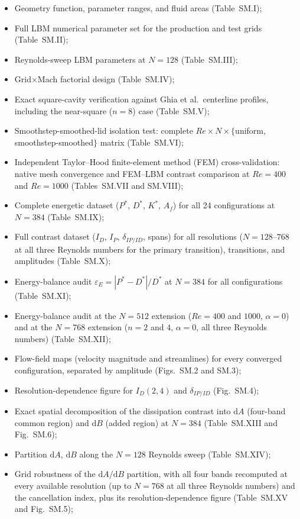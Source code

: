 \documentclass[aip,pof,reprint]{revtex4-2}
\begin{document}
\begin{itemize}
\item Geometry function, parameter ranges, and fluid areas (Table~SM.I);
\item Full LBM numerical parameter set for the production and test grids (Table~SM.II);
\item Reynolds-sweep LBM parameters at $N=128$ (Table~SM.III);
\item Grid$\times$Mach factorial design (Table~SM.IV);
\item Exact square-cavity verification against Ghia et al.\ centerline profiles, including the near-square ($n=8$) case (Table~SM.V);
\item Smoothstep-smoothed-lid isolation test: complete $Re\times N\times\{$uniform, smoothstep-smoothed$\}$ matrix (Table~SM.VI);
\item Independent Taylor--Hood finite-element method (FEM) cross-validation: native mesh convergence and FEM--LBM contrast comparison at $Re=400$ and $Re=1000$ (Tables~SM.VII and SM.VIII);
\item Complete energetic dataset ($P^*$, $D^*$, $K^*$, $A_f$) for all 24 configurations at $N=384$ (Table~SM.IX);
\item Full contrast dataset ($I_D$, $I_P$, $\delta_{IP/ID}$, spans) for all resolutions ($N=128$--$768$ at all three Reynolds numbers for the primary transition), transitions, and amplitudes (Table~SM.X);
\item Energy-balance audit $\varepsilon_E = |P^*-D^*|/D^*$ at $N=384$ for all configurations (Table~SM.XI);
\item Energy-balance audit at the $N=512$ extension ($Re=400$ and $1000$, $\alpha=0$) and at the $N=768$ extension ($n=2$ and $4$, $\alpha=0$, all three Reynolds numbers) (Table~SM.XII);
\item Flow-field maps (velocity magnitude and streamlines) for every converged configuration, separated by amplitude (Figs.~SM.2 and SM.3);
\item Resolution-dependence figure for $I_D(2,4)$ and $\delta_{IP/ID}$ (Fig.~SM.4);
\item Exact spatial decomposition of the dissipation contrast into $\mathrm{d}A$ (four-band common region) and $\mathrm{d}B$ (added region) at $N=384$ (Table~SM.XIII and Fig.~SM.6);
\item Partition $\mathrm{d}A$, $\mathrm{d}B$ along the $N=128$ Reynolds sweep (Table~SM.XIV);
\item Grid robustness of the $\mathrm{d}A/\mathrm{d}B$ partition, with all four bands recomputed at every available resolution (up to $N=768$ at all three Reynolds numbers) and the cancellation index, plus its resolution-dependence figure (Table~SM.XV and Fig.~SM.5);

\end{itemize}
\end{document}
